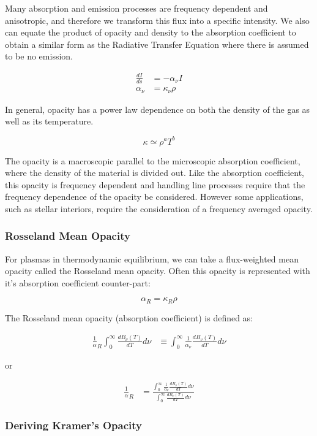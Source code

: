 \documentclass{article}
\begin{document}
Many absorption and emission processes are frequency dependent and anisotropic, and therefore we transform this flux into a specific intensity. We also can equate the product of opacity and density to the absorption coefficient to obtain a similar form as the Radiative Transfer Equation where there is assumed to be no emission.

$$
\begin{aligned}
\frac{dI}{ds} &= - \alpha_\nu I \\
\alpha_\nu &=  \kappa_\nu \rho
\end{aligned}
$$

In general, opacity has a power law dependence on both the density of the gas as well as its temperature.

$$ \kappa \simeq \rho^a T^b $$

The opacity is a macroscopic parallel to the microscopic absorption coefficient, where the density of the material is divided out. Like the absorption coefficient, this opacity is frequency dependent and handling line processes require that the frequency dependence of the opacity be considered. However some applications, such as stellar interiors, require the consideration of a frequency averaged opacity.

\subsubsection{Rosseland Mean Opacity}

For plasmas in thermodynamic equilibrium, we can take a flux-weighted mean opacity called the Rosseland mean opacity. Often this opacity is represented with it's absorption coefficient counter-part:

$$ \alpha_R = \kappa_R \rho $$

The Rosseland mean opacity (absorption coefficient) is defined as:

$$
\begin{aligned}
\frac{1}\alpha_R \int_{0}^{\infty} \frac{dB_\nu(T)}{dT} d\nu &\equiv \int_{0}^{\infty} \frac{1}{\alpha_\nu} \frac{dB_\nu(T)}{dT} d\nu
\end{aligned}
$$

or

$$
\begin{aligned}
\frac{1}\alpha_R &= \frac{\int_{0}^{\infty} \frac{1}{\alpha_\nu} \frac{dB_\nu(T)}{dT} d\nu}{\int_{0}^{\infty} \frac{dB_\nu(T)}{dT} d\nu}
\end{aligned}
$$

\subsubsection{Deriving Kramer's Opacity}
\end{document}
